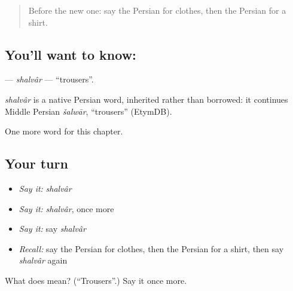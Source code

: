 \label{lesson:FA-C73-shalvar}



\begin{quote}
Before the new one: say the Persian for clothes, then the Persian for a shirt.
\end{quote}

\subsection*{You'll want to know: }
\textbf{} — \emph{shalvâr} — \textquotedblleft{}trousers\textquotedblright{}.

\begin{cousinweb}
\emph{shalvâr} is a native Persian word, inherited rather than borrowed: it continues Middle Persian \emph{šalwār}, \textquotedblleft{}trousers\textquotedblright{} (EtymDB).
\end{cousinweb}

\begin{grammarlens}[title={What you've built}]
One more word for this chapter.
\end{grammarlens}

\subsection*{Your turn}
\begin{itemize}
\raggedright
  \item \emph{Say it:} \emph{shalvâr}
  \item \emph{Say it:} \emph{shalvâr}, once more
  \item \emph{Say it:} say \emph{shalvâr}
  \item \emph{Recall:} say the Persian for clothes, then the Persian for a shirt, then say \emph{shalvâr} again
\end{itemize}

\begin{tcolorbox}[breakable,colback=teal!4,colframe=teal!35!black,title={Before you move on}]
What does  mean? (\textquotedblleft{}Trousers\textquotedblright{}.) Say it once more.
\end{tcolorbox}
